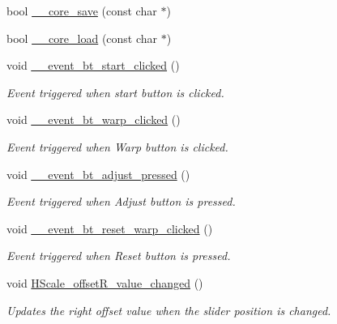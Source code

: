 \begin{DoxyCompactItemize}
bool \hyperlink{class_v_s_s_s___g_u_i_1_1_v4_l_interface_aafd4cab2700f1a0042957626ad6662f5}{\+\_\+\+\_\+core\+\_\+save} (const char $\ast$)
\item 
bool \hyperlink{class_v_s_s_s___g_u_i_1_1_v4_l_interface_a33145689f2d17c554a6b571fcdb83bcb}{\+\_\+\+\_\+core\+\_\+load} (const char $\ast$)
\item 
void \hyperlink{class_v_s_s_s___g_u_i_1_1_v4_l_interface_ac83a8f5a54baf09ade5e3ec24ba91082}{\+\_\+\+\_\+event\+\_\+bt\+\_\+start\+\_\+clicked} ()
\begin{DoxyCompactList}\small\item\em Event triggered when \textquotesingle{}start\textquotesingle{} button is clicked. \end{DoxyCompactList}\item 
void \hyperlink{class_v_s_s_s___g_u_i_1_1_v4_l_interface_add951ff9c99d2d8027a27f86412007ab}{\+\_\+\+\_\+event\+\_\+bt\+\_\+warp\+\_\+clicked} ()
\begin{DoxyCompactList}\small\item\em Event triggered when \textquotesingle{}Warp\textquotesingle{} button is clicked. \end{DoxyCompactList}\item 
void \hyperlink{class_v_s_s_s___g_u_i_1_1_v4_l_interface_ab8a8006db395031e305519fd3e199928}{\+\_\+\+\_\+event\+\_\+bt\+\_\+adjust\+\_\+pressed} ()
\begin{DoxyCompactList}\small\item\em Event triggered when \textquotesingle{}Adjust\textquotesingle{} button is pressed. \end{DoxyCompactList}\item 
void \hyperlink{class_v_s_s_s___g_u_i_1_1_v4_l_interface_a0d852b1969af63e56f6d3efceb4604ff}{\+\_\+\+\_\+event\+\_\+bt\+\_\+reset\+\_\+warp\+\_\+clicked} ()
\begin{DoxyCompactList}\small\item\em Event triggered when \textquotesingle{}Reset\textquotesingle{} button is pressed. \end{DoxyCompactList}\item 
void \hyperlink{class_v_s_s_s___g_u_i_1_1_v4_l_interface_aee8d612db51e54e9fdcd13fe97dac999}{H\+Scale\+\_\+offset\+R\+\_\+value\+\_\+changed} ()
\begin{DoxyCompactList}\small\item\em Updates the right offset value when the slider position is changed. \end{DoxyCompactList}\item 

\end{DoxyCompactItemize}
